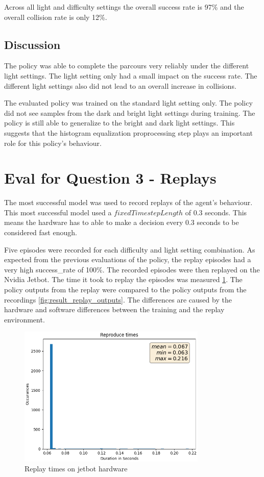 Across all light and difficulty settings the overall success rate is 97\% and the overall collision rate is only 12\%.

\subsection{Discussion}

The policy was able to complete the parcours very reliably under the different light settings. The light setting only had a small impact on the success rate.
The different light settings also did not lead to an overall increase in collisions.

The evaluated policy was trained on the standard light setting only. The policy did not see samples from the dark and bright light settings during training. The policy is still able to generalize to the bright and dark light settings.
This suggests that the histogram equalization proprocessing step plays an important role for this policy's behaviour.


\section{Eval for Question 3 - Replays}

The most successful model was used to record replays of the agent's behaviour. This most successful model used a $fixedTimestepLength$ of $0.3$ seconds. This means the hardware has to able to make a decision every $0.3$ seconds to be considered fast enough.

Five episodes were recorded for each difficulty and light setting combination. As expected from the previous evaluations of the policy, the replay episodes had a very high success\_rate of 100\%. The recorded episodes were then replayed on the Nvidia Jetbot. The time it took to replay the episodes was measured \ref{fig:result_replay_times}. The policy outputs from the replay were compared to the policy outputs from the recordings \ref{fig:result_replay_outputs}. The differences are caused by the hardware and software differences between the training and the replay environment.


\begin{figure}
    \centering
    \includegraphics[width=0.8\textwidth]{Bilder/notebook_images/replay_times.png}
    \caption{Replay times on jetbot hardware}
    \label{fig:result_replay_times}
\end{figure} %



